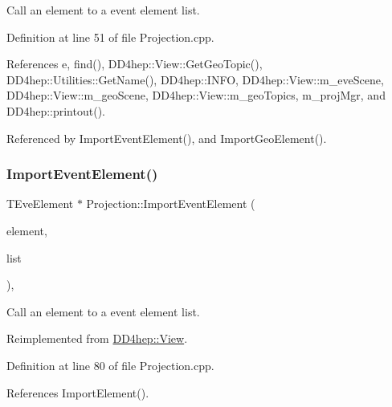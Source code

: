 Call an element to a event element list. 



Definition at line 51 of file Projection.\+cpp.



References e, find(), D\+D4hep\+::\+View\+::\+Get\+Geo\+Topic(), D\+D4hep\+::\+Utilities\+::\+Get\+Name(), D\+D4hep\+::\+I\+N\+FO, D\+D4hep\+::\+View\+::m\+\_\+eve\+Scene, D\+D4hep\+::\+View\+::m\+\_\+geo\+Scene, D\+D4hep\+::\+View\+::m\+\_\+geo\+Topics, m\+\_\+proj\+Mgr, and D\+D4hep\+::printout().



Referenced by Import\+Event\+Element(), and Import\+Geo\+Element().

\hypertarget{class_d_d4hep_1_1_projection_a63d20236b4b67710dcfb9904848465aa}{}\label{class_d_d4hep_1_1_projection_a63d20236b4b67710dcfb9904848465aa} 
\subsubsection{\texorpdfstring{Import\+Event\+Element()}{ImportEventElement()}}
{\footnotesize\ttfamily T\+Eve\+Element $\ast$ Projection\+::\+Import\+Event\+Element (\begin{DoxyParamCaption}\item[{T\+Eve\+Element $\ast$}]{element,  }\item[{\hyperlink{class_t_eve_element_list}{T\+Eve\+Element\+List} $\ast$}]{list }\end{DoxyParamCaption})\hspace{0.3cm}{\ttfamily [protected]}, {\ttfamily [virtual]}}



Call an element to a event element list. 



Reimplemented from \hyperlink{class_d_d4hep_1_1_view_acd696f9f50bda0d632cec822ab1f4672}{D\+D4hep\+::\+View}.



Definition at line 80 of file Projection.\+cpp.



References Import\+Element().

\hypertarget{class_d_d4hep_1_1_projection_a05c32084a42c00a366077acec5a55a82}{}\label{class_d_d4hep_1_1_projection_a05c32084a42c00a366077acec5a55a82} 

